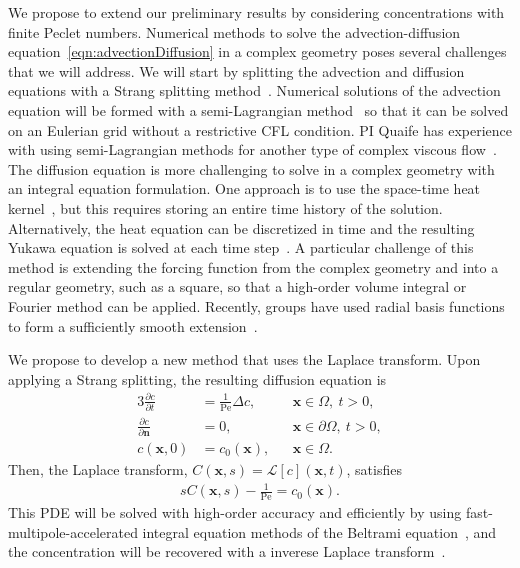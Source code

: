 \documentclass[11pt]{article}
\newcommand{\pd}[2]{ \frac{ \partial #1}{ \partial #2 } }
\newcommand{\bvec}[1]{{\mathbf{#1}}}
\newcommand{\Pe}{\mathrm{Pe}}
\newcommand{\xx}{\bvec{x}}
\newcommand{\nn}{{\mathbf{n}}}
\begin{document}
We propose to extend our preliminary results by considering
concentrations with finite Peclet numbers. Numerical methods to solve
the advection-diffusion equation~\eqref{eqn:advectionDiffusion} in a
complex geometry poses several challenges that we will address.  We will
start by splitting the advection and diffusion equations with a Strang
splitting method~\cite{str1968}.  Numerical solutions of the advection
equation will be formed with a semi-Lagrangian method~\cite{rob1981} so
that it can be solved on an Eulerian grid without a restrictive CFL
condition. PI Quaife has experience with using semi-Lagrangian
methods for another type of complex viscous flow~\cite{kab-qua-bir2017}.
The diffusion equation is more challenging to solve in a complex
geometry with an integral equation formulation.  One approach is to use
the space-time heat kernel~\cite{}, but this requires storing an entire
time history of the solution.  Alternatively, the heat equation can be
discretized in time and the resulting Yukawa equation is solved at each
time step~\cite{kro-qua2010}. A particular challenge of this method is
extending the forcing function from the complex geometry and into a
regular geometry, such as a square, so that a high-order volume integral
or Fourier method can be applied.  Recently, groups have used radial
basis functions to form a sufficiently smooth
extension~\cite{fry-kro-tor2019, fry-leh-tor2019}.

We propose to develop a new method that uses the Laplace transform.
Upon applying a Strang splitting, the resulting diffusion equation is
\begin{alignat}{3}
  \pd{c}{t} &= \frac{1}{\Pe} \Delta c, \quad &&\xx \in \Omega, \: t>0, \\
  \pd{c}{\nn} &= 0, &&\xx \in \partial\Omega, \: t>0, \\
  c(\xx,0) &= c_0(\xx), &&\xx \in \Omega.
\end{alignat}
Then, the Laplace transform, $C(\xx,s) = \mathcal{L}[c](\xx,t)$,
satisfies
\begin{align}
  sC(\xx,s) - \frac{1}{\Pe} = c_0(\xx).
\end{align}
This PDE will be solved with high-order accuracy and efficiently by
using fast-multipole-accelerated integral equation methods of the
Beltrami equation~\cite{kro-qua2011}, and the concentration will be
recovered with a inverese Laplace transform~\cite{jos-war2006}.



\end{document}

